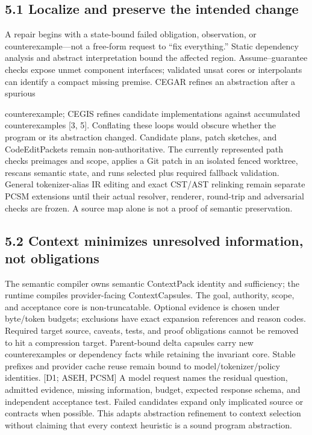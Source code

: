 \documentclass{article}
\begin{document}
\subsection*{5.1 Localize and preserve the intended change}

A repair begins with a state-bound failed obligation, observation, or counterexample—not a free-form
request to “fix everything.” Static dependency analysis and abstract interpretation bound the affected
region. Assume–guarantee checks expose unmet component interfaces; validated unsat cores or
interpolants can identify a compact missing premise. CEGAR refines an abstraction after a spurious


counterexample; CEGIS refines candidate implementations against accumulated counterexamples
[3, 5]. Conflating these loops would obscure whether the program or its abstraction changed.
Candidate plans, patch sketches, and CodeEditPackets remain non-authoritative. The currently
represented path checks preimages and scope, applies a Git patch in an isolated fenced worktree,
rescans semantic state, and runs selected plus required fallback validation. General tokenizer-alias IR
editing and exact CST/AST relinking remain separate PCSM extensions until their actual resolver,
renderer, round-trip and adversarial checks are frozen. A source map alone is not a proof of semantic
preservation.

\subsection*{5.2 Context minimizes unresolved information, not obligations}

The semantic compiler owns semantic ContextPack identity and sufficiency; the runtime compiles
provider-facing ContextCapsules. The goal, authority, scope, and acceptance core is non-truncatable.
Optional evidence is chosen under byte/token budgets; exclusions have exact expansion references
and reason codes. Required target source, caveats, tests, and proof obligations cannot be removed
to hit a compression target. Parent-bound delta capsules carry new counterexamples or dependency
facts while retaining the invariant core. Stable prefixes and provider cache reuse remain bound to
model/tokenizer/policy identities. [D1; ASEH, PCSM]
A model request names the residual question, admitted evidence, missing information, budget,
expected response schema, and independent acceptance test. Failed candidates expand only implicated
source or contracts when possible. This adapts abstraction refinement to context selection without
claiming that every context heuristic is a sound program abstraction.
\end{document}
